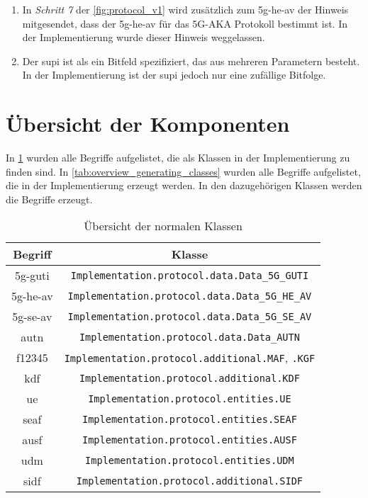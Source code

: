 \begin{enumerate}
\item In \textit{Schritt 7} der \cref{fig:protocol_v1} wird zusätzlich zum \gls{5g-he-av} der Hinweis mitgesendet, dass der \gls{5g-he-av} für das 5G-AKA Protokoll bestimmt ist.
In der Implementierung wurde dieser Hinweis weggelassen.

\item Der \gls{supi} ist als ein Bitfeld spezifiziert, das aus mehreren Parametern besteht.
In der Implementierung ist der \gls{supi} jedoch nur eine zufällige Bitfolge.

\end{enumerate}


\section{Übersicht der Komponenten}

In \cref{tab:overview_classes} wurden alle Begriffe aufgelistet, die als Klassen in der Implementierung zu finden sind.
In \cref{tab:overview_generating_classes} wurden alle Begriffe aufgelistet, die in der Implementierung erzeugt werden.
In den dazugehörigen Klassen werden die Begriffe erzeugt.

\begin{table}
\centering
\begin{tabular}{|c|c|}
\hline
\textbf{Begriff} & \textbf{Klasse} \\ \hline
{\gls{5g-guti}} & \texttt{Implementation.protocol.data.Data\_5G\_GUTI} \\
{\gls{5g-he-av}} & \texttt{Implementation.protocol.data.Data\_5G\_HE\_AV} \\
{\gls{5g-se-av}} & \texttt{Implementation.protocol.data.Data\_5G\_SE\_AV} \\
{\gls{autn}} & \texttt{Implementation.protocol.data.Data\_AUTN} \\
{\gls{f12345}} & \texttt{Implementation.protocol.additional.MAF}, \texttt{.KGF} \\
{\gls{kdf}} & \texttt{Implementation.protocol.additional.KDF} \\ 
\hline
{\gls{ue}} & \texttt{Implementation.protocol.entities.UE} \\
{\gls{seaf}} & \texttt{Implementation.protocol.entities.SEAF} \\
{\gls{ausf}} & \texttt{Implementation.protocol.entities.AUSF} \\
{\gls{udm}} & \texttt{Implementation.protocol.entities.UDM} \\
{\gls{sidf}} & \texttt{Implementation.protocol.additional.SIDF} \\
\hline
\end{tabular}
\caption{Übersicht der normalen Klassen}
\label{tab:overview_classes}
\end{table}


